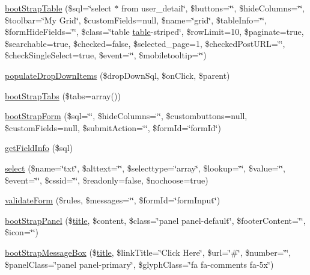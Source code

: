 \begin{DoxyCompactItemize}
\item 
\hyperlink{classCody_a02b87ff5b670069a90d222359c929380}{boot\+Strap\+Table} (\$sql=\char`\"{}select $\ast$ from user\+\_\+detail\char`\"{}, \$buttons=\char`\"{}\char`\"{}, \$hide\+Columns=\char`\"{}\char`\"{}, \$toolbar=\char`\"{}My Grid\char`\"{}, \$custom\+Fields=null, \$name=\char`\"{}grid\char`\"{}, \$table\+Info=\char`\"{}\char`\"{}, \$form\+Hide\+Fields=\char`\"{}\char`\"{}, \$class=\char`\"{}table \hyperlink{Shape_8php_a5aa7b43c8ec77df216a71a27da0a321c}{table}-\/striped\char`\"{}, \$row\+Limit=10, \$paginate=true, \$searchable=true, \$checked=false, \$selected\+\_\+page=1, \$checked\+Post\+U\+R\+L=\char`\"{}\char`\"{}, \$check\+Single\+Select=true, \$event=\char`\"{}\char`\"{}, \$mobiletooltip=\char`\"{}\char`\"{})
\item 
\hyperlink{classCody_ade934190b62559aae3d784f7681253af}{populate\+Drop\+Down\+Items} (\$drop\+Down\+Sql, \$on\+Click, \$parent)
\item 
\hyperlink{classCody_a91baebb215438e27a00b211a2e352b14}{boot\+Strap\+Tabs} (\$tabs=array())
\item 
\hyperlink{classCody_aa9b7f95b58c305f6eac09e3ed24c5dfe}{boot\+Strap\+Form} (\$sql=\char`\"{}\char`\"{}, \$hide\+Columns=\char`\"{}\char`\"{}, \$custombuttons=null, \$custom\+Fields=null, \$submit\+Action=\char`\"{}\char`\"{}, \$form\+Id=\char`\"{}form\+Id\char`\"{})
\item 
\hyperlink{classCody_a9190879d7bba88107875e2fe4723804c}{get\+Field\+Info} (\$sql)
\item 
\hyperlink{classCody_a11ec72bcb8aa970fd04b058bd3612cd0}{select} (\$name=\char`\"{}txt\char`\"{}, \$alttext=\char`\"{}\char`\"{}, \$selecttype=\char`\"{}array\char`\"{}, \$lookup=\char`\"{}\char`\"{}, \$value=\char`\"{}\char`\"{}, \$event=\char`\"{}\char`\"{}, \$cssid=\char`\"{}\char`\"{}, \$readonly=false, \$nochoose=true)
\item 
\hyperlink{classCody_ad923b413da151f230932758e98530a7f}{validate\+Form} (\$rules, \$messages=\char`\"{}\char`\"{}, \$form\+Id=\char`\"{}form\+Input\char`\"{})
\item 
\hyperlink{classCody_a286ac4c282deba8991d57ce83f43a07f}{boot\+Strap\+Panel} (\$\hyperlink{Shape_8php_ad264ad0cabbe965bf7f7c8a5ed6abebb}{title}, \$content, \$class=\char`\"{}panel panel-\/default\char`\"{}, \$footer\+Content=\char`\"{}\char`\"{}, \$icon=\char`\"{}\char`\"{})
\item 
\hyperlink{classCody_a5eaecf702f81ad0cee70cad3a7f9bcfa}{boot\+Strap\+Message\+Box} (\$\hyperlink{Shape_8php_ad264ad0cabbe965bf7f7c8a5ed6abebb}{title}, \$link\+Title=\char`\"{}Click Here\char`\"{}, \$url=\char`\"{}\#\char`\"{}, \$number=\char`\"{}\char`\"{}, \$panel\+Class=\char`\"{}panel panel-\/primary\char`\"{}, \$glyph\+Class=\char`\"{}fa fa-\/comments fa-\/5x\char`\"{})

\end{DoxyCompactItemize}
